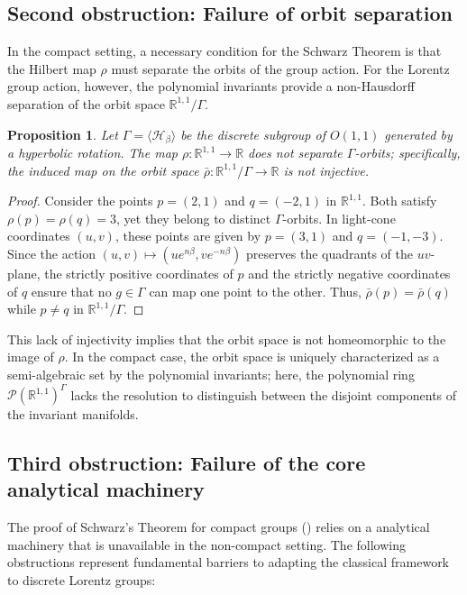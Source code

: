 \documentclass[]{article}
\newtheorem{proposition}[theorem]{Proposition}
\begin{document}
\subsection{Second obstruction: Failure of orbit separation}
	In the compact setting, a necessary condition for the Schwarz Theorem is that the Hilbert map $\rho$ must separate the orbits of the group action. For the Lorentz group action, however, the polynomial invariants provide a non-Hausdorff separation of the orbit space $\mathbb{R}^{1,1}/\Gamma$.
	
	\begin{proposition} \label{prop:separation}
		Let $\Gamma = \langle \mathcal{H}_\beta \rangle$ be the discrete subgroup of $O(1,1)$ generated by a hyperbolic rotation. The map $\rho: \mathbb{R}^{1,1} \to \mathbb{R}$ does not separate $\Gamma$-orbits; specifically, the induced map on the orbit space $\bar{\rho} : \mathbb{R}^{1,1}/\Gamma \to \mathbb{R}$ is not injective.
	\end{proposition}
	\begin{proof}
		Consider the points $p = (2, 1)$ and $q = (-2, 1)$ in $\mathbb{R}^{1,1}$. Both satisfy $\rho(p) = \rho(q) = 3$, yet they belong to distinct $\Gamma$-orbits. In light-cone coordinates $(u, v)$, these points are given by $p = (3, 1)$ and $q = (-1, -3)$. Since the action $(u, v) \mapsto (u e^{n\beta}, v e^{-n\beta})$ preserves the quadrants of the $uv$-plane, the strictly positive coordinates of $p$ and the strictly negative coordinates of $q$ ensure that no $g \in \Gamma$ can map one point to the other. Thus, $\bar{\rho}(p) = \bar{\rho}(q)$ while $p \neq q$ in $\mathbb{R}^{1,1}/\Gamma$.
	\end{proof}
	
	This lack of injectivity implies that the orbit space is not homeomorphic to the image of $\rho$. In the compact case, the orbit space is uniquely characterized as a semi-algebraic set by the polynomial invariants; here, the polynomial ring $\mathcal{P}(\mathbb{R}^{1,1})^\Gamma$ lacks the resolution to distinguish between the disjoint components of the invariant manifolds.

\bigskip

\subsection{Third obstruction: Failure of the core analytical machinery}

The proof of Schwarz's Theorem for compact groups (\cite{schwarz1975}) relies on a analytical machinery that is unavailable in the non-compact setting. The following obstructions represent fundamental barriers to adapting the classical framework to discrete Lorentz groups:
\end{document}
